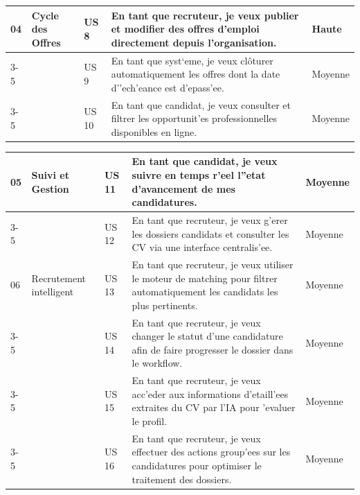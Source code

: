 \begin{table}[H]
\begin{tabular}{|p{1.2cm}|p{3.5cm}|p{1.2cm}|p{7.5cm}|p{1.8cm}|}
04 & Cycle des Offres & US 8 & En tant que recruteur, je veux publier et modifier des offres d'emploi directement depuis l'organisation. & Haute \\
\cline{3-5}
& & US 9 & En tant que syst`eme, je veux clôturer automatiquement les offres dont la date d''ech'eance est d'epass'ee. & Moyenne \\
\cline{3-5}
& & US 10 & En tant que candidat, je veux consulter et filtrer les opportunit'es professionnelles disponibles en ligne. & Moyenne \\

\hline
\end{tabular}
\end{table}


\begin{table}[H]
\centering
\renewcommand{\arraystretch}{1.4}
\begin{tabular}{|p{1.2cm}|p{3cm}|p{1.2cm}|p{8cm}|p{1.8cm}|}
\hline

05 & Suivi et Gestion & US 11 & En tant que candidat, je veux suivre en temps r'eel l''etat d'avancement de mes candidatures. & Moyenne \\
\cline{3-5}
& & US 12 & En tant que recruteur, je veux g'erer les dossiers candidats et consulter les CV via une interface centralis'ee. & Moyenne \\
\hline

06 & Recrutement intelligent & US 13 & En tant que recruteur, je veux utiliser le moteur de matching pour filtrer automatiquement les candidats les plus pertinents. & Moyenne \\
\cline{3-5}
& & US 14 & En tant que recruteur, je veux changer le statut d'une candidature afin de faire progresser le dossier dans le workflow. & Moyenne \\
\cline{3-5}
& & US 15 & En tant que recruteur, je veux acc'eder aux informations d'etaill'ees extraites du CV par l'IA pour 'evaluer le profil. & Moyenne \\
\cline{3-5}
& & US 16 & En tant que recruteur, je veux effectuer des actions group'ees sur les candidatures pour optimiser le traitement des dossiers. & Moyenne \\
\hline


\end{tabular}
\end{table}
